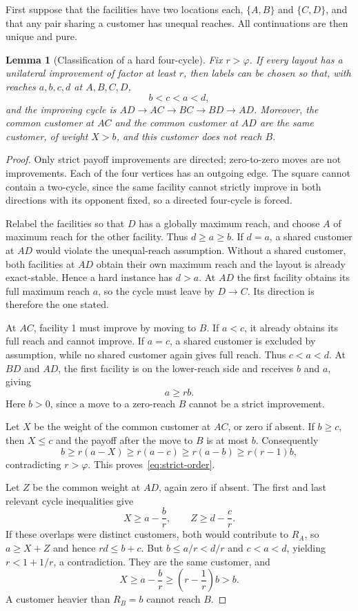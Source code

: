\documentclass[11pt]{article}
\newtheorem{lemma}[theorem]{Lemma}
\theoremstyle{definition}
\theoremstyle{remark}
\newcommand{\phiG}{\varphi}
\begin{document}
First suppose that the facilities have two locations each, $\{A,B\}$ and $\{C,D\}$, and that any pair sharing a customer has unequal reaches. All continuations are then unique and pure.

\begin{lemma}[Classification of a hard four-cycle]\label{lem:classification}
Fix $r>\phiG$. If every layout has a unilateral improvement of factor at least $r$, then labels can be chosen so that, with reaches $a,b,c,d$ at $A,B,C,D$,
\begin{equation}\label{eq:strict-order}
 b<c<a<d,
\end{equation}
and the improving cycle is $AD\to AC\to BC\to BD\to AD$. Moreover, the common customer at $AC$ and the common customer at $AD$ are the same customer, of weight $X>b$, and this customer does not reach $B$.
\end{lemma}
\begin{proof}
Only strict payoff improvements are directed; zero-to-zero moves are not improvements. Each of the four vertices has an outgoing edge. The square cannot contain a two-cycle, since the same facility cannot strictly improve in both directions with its opponent fixed, so a directed four-cycle is forced.

Relabel the facilities so that $D$ has a globally maximum reach, and choose $A$ of maximum reach for the other facility. Thus $d\ge a\ge b$. If $d=a$, a shared customer at $AD$ would violate the unequal-reach assumption. Without a shared customer, both facilities at $AD$ obtain their own maximum reach and the layout is already exact-stable. Hence a hard instance has $d>a$. At $AD$ the first facility obtains its full maximum reach $a$, so the cycle must leave by $D\to C$. Its direction is therefore the one stated.

At $AC$, facility 1 must improve by moving to $B$. If $a<c$, it already obtains its full reach and cannot improve. If $a=c$, a shared customer is excluded by assumption, while no shared customer again gives full reach. Thus $c<a<d$. At $BD$ and $AD$, the first facility is on the lower-reach side and receives $b$ and $a$, giving
\begin{equation}\label{eq:a-rb}
 a\ge rb.
\end{equation}
Here $b>0$, since a move to a zero-reach $B$ cannot be a strict improvement.

Let $X$ be the weight of the common customer at $AC$, or zero if absent. If $b\ge c$, then $X\le c$ and the payoff after the move to $B$ is at most $b$. Consequently
\[
 b\ge r(a-X)\ge r(a-c)\ge r(a-b)\ge r(r-1)b,
\]
contradicting $r>\phiG$. This proves~\eqref{eq:strict-order}.

Let $Z$ be the common weight at $AD$, again zero if absent. The first and last relevant cycle inequalities give
\[
 X\ge a-\frac br,\qquad Z\ge d-\frac cr.
\]
If these overlaps were distinct customers, both would contribute to $R_A$, so $a\ge X+Z$ and hence $rd\le b+c$. But $b\le a/r<d/r$ and $c<a<d$, yielding $r<1+1/r$, a contradiction. They are the same customer, and
\[
 X\ge a-\frac br\ge\left(r-\frac1r\right)b>b.
\]
A customer heavier than $R_B=b$ cannot reach $B$.
\end{proof}
\end{document}

